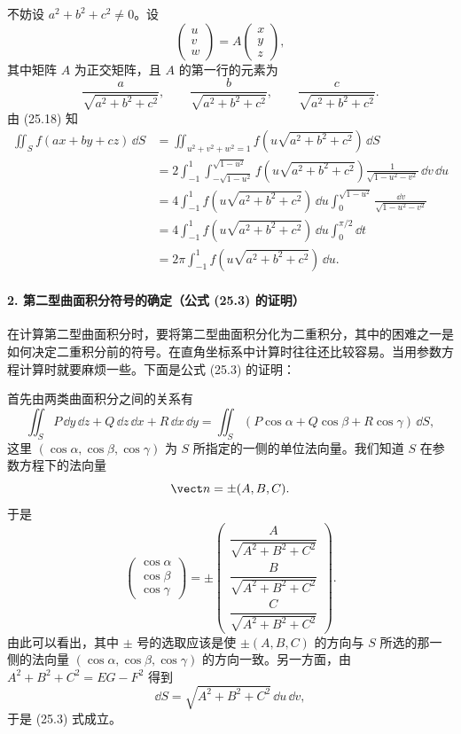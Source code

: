 \begin{xproof}
不妨设 $a^2+b^2+c^2\ne0$。设
\[
  \begin{pmatrix}u\\v\\w\end{pmatrix}
  =A\begin{pmatrix}x\\y\\z\end{pmatrix},
\]
其中矩阵 $A$ 为正交矩阵，且 $A$ 的第一行的元素为
\[
  \frac a{\sqrt{a^2+b^2+c^2}},\qquad
  \frac b{\sqrt{a^2+b^2+c^2}},\qquad
  \frac c{\sqrt{a^2+b^2+c^2}}.
\]
由 (25.18) 知
\begin{align*}
\iint_Sf(ax+by+cz)\,\dd S
&=\iint_{u^2+v^2+w^2=1}f\left(u\sqrt{a^2+b^2+c^2}\right)\,\dd S\\
&=2\int_{-1}^1\int_{-\sqrt{1-u^2}}^{\sqrt{1-u^2}}
 f\left(u\sqrt{a^2+b^2+c^2}\right)
 \frac1{\sqrt{1-u^2-v^2}}\,\dd v\,\dd u\\
&=4\int_{-1}^1 f\left(u\sqrt{a^2+b^2+c^2}\right)\,\dd u
\int_0^{\sqrt{1-u^2}}\frac{\dd v}{\sqrt{1-u^2-v^2}}\\
&=4\int_{-1}^1f\left(u\sqrt{a^2+b^2+c^2}\right)\,\dd u\int_0^{\pi/2}\dd t\\
&=2\pi\int_{-1}^1f\left(u\sqrt{a^2+b^2+c^2}\right)\,\dd u.
\end{align*}
\end{xproof}

\paragraph{2. 第二型曲面积分符号的确定（公式 (25.3) 的证明）}

在计算第二型曲面积分时，要将第二型曲面积分化为二重积分，其中的困难之一是如何决定二重积分前的符号。在直角坐标系中计算时往往还比较容易。当用参数方程计算时就要麻烦一些。下面是公式 (25.3) 的证明：

首先由两类曲面积分之间的关系有
\[
  \iint_S P\,\dd y\,\dd z+Q\,\dd z\,\dd x+R\,\dd x\,\dd y
  =\iint_S(P\cos\alpha+Q\cos\beta+R\cos\gamma)\,\dd S,
\]
这里 $(\cos\alpha,\cos\beta,\cos\gamma)$ 为 $S$ 所指定的一侧的单位法向量。我们知道 $S$ 在参数方程下的法向量
\[
  \vect n=\pm(A,B,C).
\]
于是
\[
  \begin{pmatrix}\cos\alpha\\\cos\beta\\\cos\gamma\end{pmatrix}
  =\pm
  \begin{pmatrix}
  \dfrac A{\sqrt{A^2+B^2+C^2}}\\[4pt]
  \dfrac B{\sqrt{A^2+B^2+C^2}}\\[4pt]
  \dfrac C{\sqrt{A^2+B^2+C^2}}
  \end{pmatrix}.
\]
由此可以看出，其中 $\pm$ 号的选取应该是使 $\pm(A,B,C)$ 的方向与 $S$ 所选的那一侧的法向量 $(\cos\alpha,\cos\beta,\cos\gamma)$ 的方向一致。另一方面，由 $A^2+B^2+C^2=EG-F^2$ 得到
\[
  \dd S=\sqrt{A^2+B^2+C^2}\,\dd u\,\dd v,
\]
于是 (25.3) 式成立。

